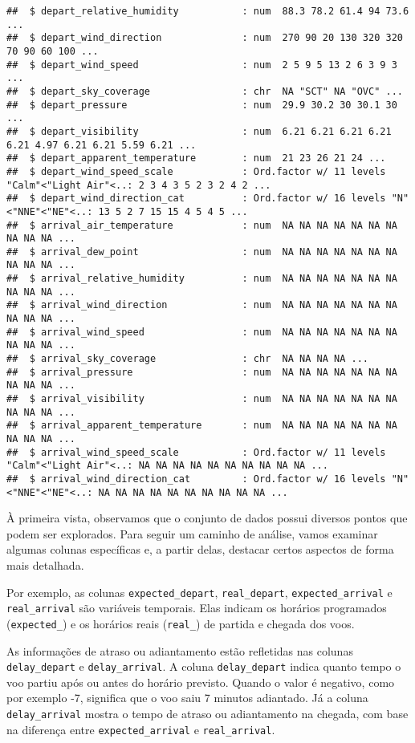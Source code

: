 \documentclass[
]{article}
\begin{document}
\begin{verbatim}
##  $ depart_relative_humidity           : num  88.3 78.2 61.4 94 73.6 ...
##  $ depart_wind_direction              : num  270 90 20 130 320 320 70 90 60 100 ...
##  $ depart_wind_speed                  : num  2 5 9 5 13 2 6 3 9 3 ...
##  $ depart_sky_coverage                : chr  NA "SCT" NA "OVC" ...
##  $ depart_pressure                    : num  29.9 30.2 30 30.1 30 ...
##  $ depart_visibility                  : num  6.21 6.21 6.21 6.21 6.21 4.97 6.21 6.21 5.59 6.21 ...
##  $ depart_apparent_temperature        : num  21 23 26 21 24 ...
##  $ depart_wind_speed_scale            : Ord.factor w/ 11 levels "Calm"<"Light Air"<..: 2 3 4 3 5 2 3 2 4 2 ...
##  $ depart_wind_direction_cat          : Ord.factor w/ 16 levels "N"<"NNE"<"NE"<..: 13 5 2 7 15 15 4 5 4 5 ...
##  $ arrival_air_temperature            : num  NA NA NA NA NA NA NA NA NA NA ...
##  $ arrival_dew_point                  : num  NA NA NA NA NA NA NA NA NA NA ...
##  $ arrival_relative_humidity          : num  NA NA NA NA NA NA NA NA NA NA ...
##  $ arrival_wind_direction             : num  NA NA NA NA NA NA NA NA NA NA ...
##  $ arrival_wind_speed                 : num  NA NA NA NA NA NA NA NA NA NA ...
##  $ arrival_sky_coverage               : chr  NA NA NA NA ...
##  $ arrival_pressure                   : num  NA NA NA NA NA NA NA NA NA NA ...
##  $ arrival_visibility                 : num  NA NA NA NA NA NA NA NA NA NA ...
##  $ arrival_apparent_temperature       : num  NA NA NA NA NA NA NA NA NA NA ...
##  $ arrival_wind_speed_scale           : Ord.factor w/ 11 levels "Calm"<"Light Air"<..: NA NA NA NA NA NA NA NA NA NA ...
##  $ arrival_wind_direction_cat         : Ord.factor w/ 16 levels "N"<"NNE"<"NE"<..: NA NA NA NA NA NA NA NA NA NA ...
\end{verbatim}

À primeira vista, observamos que o conjunto de dados possui diversos
pontos que podem ser explorados. Para seguir um caminho de análise,
vamos examinar algumas colunas específicas e, a partir delas, destacar
certos aspectos de forma mais detalhada.

Por exemplo, as colunas \texttt{expected\_depart},
\texttt{real\_depart}, \texttt{expected\_arrival} e
\texttt{real\_arrival} são variáveis temporais. Elas indicam os horários
programados (\texttt{expected\_}) e os horários reais (\texttt{real\_})
de partida e chegada dos voos.

As informações de atraso ou adiantamento estão refletidas nas colunas
\texttt{delay\_depart} e \texttt{delay\_arrival}. A coluna
\texttt{delay\_depart} indica quanto tempo o voo partiu após ou antes do
horário previsto. Quando o valor é negativo, como por exemplo -7,
significa que o voo saiu 7 minutos adiantado. Já a coluna
\texttt{delay\_arrival} mostra o tempo de atraso ou adiantamento na
chegada, com base na diferença entre \texttt{expected\_arrival} e
\texttt{real\_arrival}.
\end{document}
